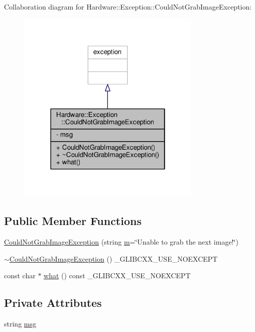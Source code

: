 Collaboration diagram for Hardware\+:\+:Exception\+:\+:Could\+Not\+Grab\+Image\+Exception\+:\nopagebreak
\begin{figure}[H]
\begin{center}
\leavevmode
\includegraphics[width=250pt]{class_hardware_1_1_exception_1_1_could_not_grab_image_exception__coll__graph}
\end{center}
\end{figure}
\subsection*{Public Member Functions}
\begin{DoxyCompactItemize}
\item 
\hyperlink{class_hardware_1_1_exception_1_1_could_not_grab_image_exception_a8bddfebe4a59346dbddae7f8bf85af8a}{Could\+Not\+Grab\+Image\+Exception} (string \hyperlink{_gen_blob_8m_ab3cd915d758008bd19d0f2428fbb354a}{m}=\char`\"{}Unable to grab the next image!\char`\"{})
\item 
\hyperlink{class_hardware_1_1_exception_1_1_could_not_grab_image_exception_a8f476ae2d11458f632ba2ecfd9016cb3}{$\sim$\+Could\+Not\+Grab\+Image\+Exception} () \+\_\+\+G\+L\+I\+B\+C\+X\+X\+\_\+\+U\+S\+E\+\_\+\+N\+O\+E\+X\+C\+E\+P\+T
\item 
const char $\ast$ \hyperlink{class_hardware_1_1_exception_1_1_could_not_grab_image_exception_a1d4483097dc5dc87a90380988999b9fd}{what} () const \+\_\+\+G\+L\+I\+B\+C\+X\+X\+\_\+\+U\+S\+E\+\_\+\+N\+O\+E\+X\+C\+E\+P\+T
\end{DoxyCompactItemize}
\subsection*{Private Attributes}
\begin{DoxyCompactItemize}
\item 
string \hyperlink{class_hardware_1_1_exception_1_1_could_not_grab_image_exception_a3fe61759aec4ce332a968f49ced6b12a}{msg}
\end{DoxyCompactItemize}


